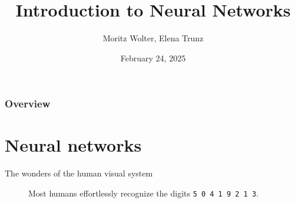 \documentclass{beamer}
\title{Introduction to Neural Networks}
\date{February 24, 2025}%
\institute{Visual Computing Group, University of Bonn}
\author{Moritz Wolter, Elena Trunz}
\begin{document}
    \maketitle

    \begin{frame}
    \frametitle{Overview} 
    \tableofcontents
    \end{frame}

    \section{Neural networks}
    \begin{frame}{The wonders of the human visual system}
      \begin{figure}
        
        \caption{Most humans effortlessly recognize the digits \texttt{5 0 4 1 9 2 1 3}.}
      \end{figure}
    \end{frame}
\end{document}
